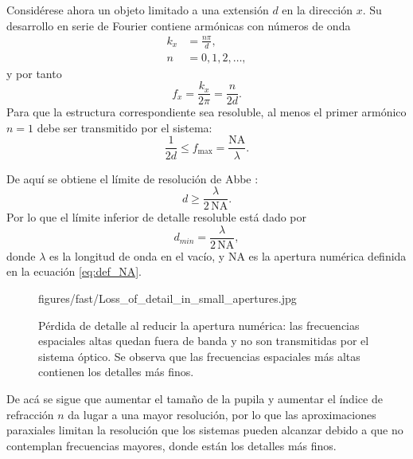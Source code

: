Considérese ahora un objeto limitado a una extensión \(d\) en la dirección \(x\). Su desarrollo en serie de Fourier contiene armónicas con números de onda
\begin{equation}
\begin{aligned}
k_x &= \frac{n\pi}{d},
\\
n &= 0,1,2,\dots,
\end{aligned}
\end{equation}
y por tanto
\begin{equation}
f_x = \frac{k_x}{2\pi} = \frac{n}{2d}.
\end{equation}
Para que la estructura correspondiente sea resoluble, al menos el primer armónico \(n=1\) debe ser transmitido por el sistema:
\begin{equation}
\frac{1}{2d} \le f_{\max} = \frac{\mathrm{NA}}{\lambda}.
\end{equation}

De aquí se obtiene el límite de resolución de Abbe \cite{Abbe1873}:
\begin{equation}
d \ge \frac{\lambda}{2\,\mathrm{NA}}.
\end{equation}
Por lo que el límite inferior de detalle resoluble está dado por
\begin{equation}
  d_{min} = \frac{\lambda}{2\,\mathrm{NA}},
\label{eq:abbe_resolution_limit}
\end{equation}
donde \(\lambda\) es la longitud de onda en el vacío, y \(\mathrm{NA}\) es la apertura numérica definida en la ecuación \eqref{eq:def_NA}.

\begin{figure}[H]
    \centering
      {figures/fast/Loss_of_detail_in_small_apertures.jpg}
    \caption{Pérdida de detalle al reducir la apertura numérica: las frecuencias espaciales altas quedan fuera de banda y no son transmitidas por el sistema óptico. Se observa que las frecuencias espaciales más altas contienen los detalles más finos.}
    \label{fig:loss_detail_small_apertures}
\end{figure}

De acá se sigue que aumentar el tamaño de la pupila y aumentar el índice de refracción $n$ da lugar a una mayor resolución, por lo que las aproximaciones paraxiales limitan la resolución que los sistemas pueden alcanzar debido a que no contemplan frecuencias mayores, donde están los detalles más finos.



